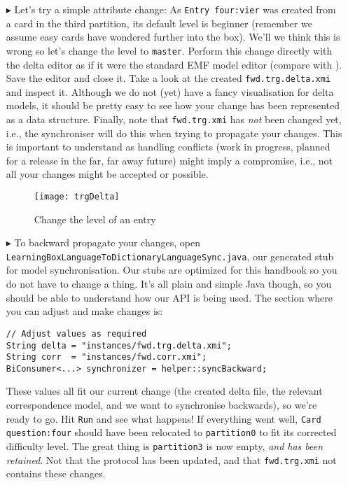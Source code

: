 \begin{itemize}
\item[$\blacktriangleright$] Let's try a simple attribute change:  As \texttt{Entry four:vier} was created from a card in the third partition, its default level is beginner (remember we assume easy cards have wondered further into the box).
We'll we think this is wrong so let's change the level to \texttt{master}.
Perform this change directly with the delta editor as if it were the standard EMF model editor (compare with ).
Save the editor and close it.
Take a look at the created \texttt{fwd.trg.delta.xmi} and inspect it.
Although we do not (yet) have a fancy visualisation for delta models, it should be pretty easy to see how your change has been represented as a data structure.
Finally, note that \texttt{fwd.trg.xmi} has \emph{not} been changed yet, i.e., the synchroniser will do this when trying to propagate your changes.
This is important to understand as handling conflicts (work in progress, planned for a release in the far, far away future) might imply a compromise, i.e., not all your changes might be accepted or possible.

\begin{figure}[htbp]
\begin{center}
  \texttt{[image: trgDelta]}
  \caption{Change the level of an entry}
  \label{fig:trgDelta}
\end{center}
\end{figure}

\item[$\blacktriangleright$] To backward propagate your changes, open
\texttt{Learning\-Box\-Language\-To\-Dictionary\-Language\-Sync.java}, our generated stub for model synchronisation.
Our stubs are optimized for this handbook so you do not have to change a thing.
It's all plain and simple Java though, so you should be able to understand
how our API is being used.
The section where you can adjust and make changes is:
\begin{verbatim}
// Adjust values as required
String delta = "instances/fwd.trg.delta.xmi";
String corr  = "instances/fwd.corr.xmi";
BiConsumer<...> synchronizer = helper::syncBackward;
\end{verbatim}

These values all fit our current change (the created delta file, the relevant correspondence model, and we want to synchronise backwards), so we're ready to go.
Hit \texttt{Run} and see what happens!
If everything went well, \texttt{Card question:four} should have been relocated to \texttt{partition0} to fit its corrected difficulty level.
The great thing is \texttt{partition3} is now empty, \emph{and has been retained}.
Not that the protocol has been updated, and that \texttt{fwd.trg.xmi} not contains these changes.
\end{itemize}

